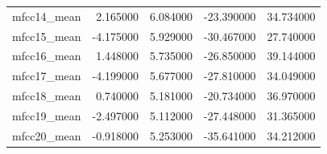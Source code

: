 \begin{table}[H]
\begin{tabular}{lrrrr}
mfcc14\_mean & 2.165000 & 6.084000 & -23.390000 & 34.734000 \\
mfcc15\_mean & -4.175000 & 5.929000 & -30.467000 & 27.740000 \\
mfcc16\_mean & 1.448000 & 5.735000 & -26.850000 & 39.144000 \\
mfcc17\_mean & -4.199000 & 5.677000 & -27.810000 & 34.049000 \\
mfcc18\_mean & 0.740000 & 5.181000 & -20.734000 & 36.970000 \\
mfcc19\_mean & -2.497000 & 5.112000 & -27.448000 & 31.365000 \\
mfcc20\_mean & -0.918000 & 5.253000 & -35.641000 & 34.212000 \\
\bottomrule
\end{tabular}
\end{table}
